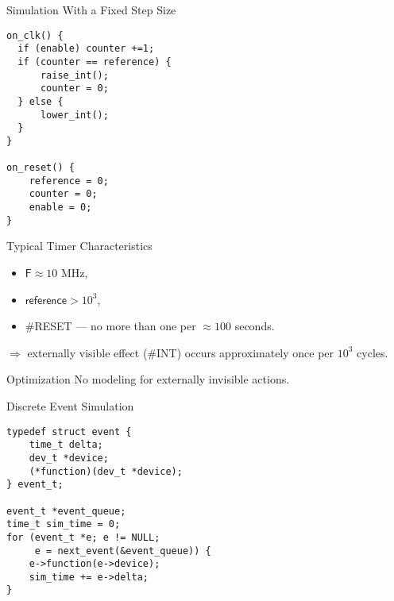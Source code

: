 \begin{frame}[fragile]{Simulation With a Fixed Step Size}
\begin{lstlisting}
on_clk() {
  if (enable) counter +=1;
  if (counter == reference) {
      raise_int();
      counter = 0;
  } else {
      lower_int();
  }
}

on_reset() {
    reference = 0;
    counter = 0;
    enable = 0;
}
\end{lstlisting}
\end{frame}

\begin{frame}{Typical Timer Characteristics}
\begin{itemize}
    \item $\mathsf{F} \approx 10$ MHz,
    \item $\mathsf{reference} > 10^3$,
    \item \#RESET --- no more than one per $\approx 100$ seconds.
\end{itemize}
\vfill
$\Rightarrow$ externally visible effect (\#INT) occurs approximately once per
$10^3$ cycles.
\end{frame}

\begin{frame}{Optimization}
No modeling for externally invisible actions.
\vfill
\centering
{}
\end{frame}

\begin{frame}[fragile]{Discrete Event Simulation}
\begin{lstlisting}
typedef struct event {
    time_t delta;
    dev_t *device;
    (*function)(dev_t *device);
} event_t;

event_t *event_queue;
time_t sim_time = 0;
for (event_t *e; e != NULL;
     e = next_event(&event_queue)) {
    e->function(e->device);
    sim_time += e->delta;
}
\end{lstlisting}
\end{frame}


